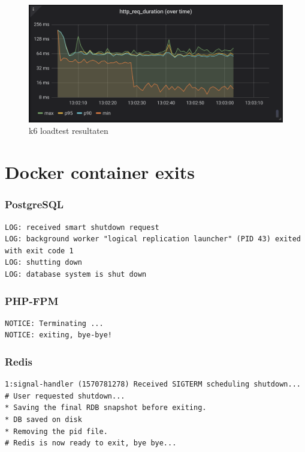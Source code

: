 \begin{figure}[H]
	\centering
	\includegraphics[width=13cm]{Figures/loadtestrequests}
	\decoRule
	\caption[k6 loadtest resultaten]{k6 loadtest resultaten}
	\label{fig:loadtestresultaten}
\end{figure}


\section{Docker container exits}

\label{DockerExits}

\subsubsection{PostgreSQL}
\begin{verbatim}
LOG: received smart shutdown request
LOG: background worker "logical replication launcher" (PID 43) exited with exit code 1
LOG: shutting down
LOG: database system is shut down
\end{verbatim}

\subsubsection{PHP-FPM}
\begin{verbatim}
NOTICE: Terminating ...
NOTICE: exiting, bye-bye!
\end{verbatim}

\subsubsection{Redis}
\begin{verbatim}
1:signal-handler (1570781278) Received SIGTERM scheduling shutdown...
# User requested shutdown...
* Saving the final RDB snapshot before exiting.
* DB saved on disk
* Removing the pid file.
# Redis is now ready to exit, bye bye...
\end{verbatim}

